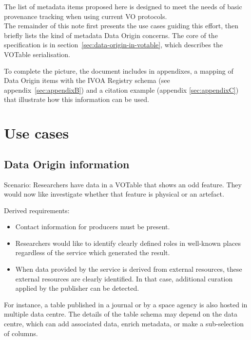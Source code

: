 \documentclass[11pt,a4paper]{ivoa}
\begin{document}
The list of metadata items proposed here is designed to meet the needs of basic provenance
tracking when using current VO protocols.\\


The remainder of this note first presents the use cases guiding this
effort, then briefly lists the kind of metadata Data Origin concerns.
The core of the specification is in
section~\ref{sec:data-origin-in-votable}, which
describes the VOTable serialisation.

To complete the picture, the document includes in appendixes, a mapping of Data Origin items with the IVOA Registry schema (see appendix~\ref{sec:appendixB})
and a citation example (appendix \ref{sec:appendixC}) that illustrate how this information can be used.



\section{Use cases}

\subsection{Data Origin information}

Scenario: Researchers have data in a VOTable that shows an odd feature. They would now like investigate whether that feature is physical or an artefact.

Derived requirements:

\begin{itemize}
\item Contact information for producers must be present.

\item Researchers would like to identify clearly defined roles in well-known places regardless of the service which generated the result.

\item When data provided by the service is derived from external resources, these external resources are clearly identified.  In that case, additional curation applied by the publisher can be detected.
\end{itemize}

For instance, a table published in a journal or by a space agency is also hosted in multiple data centre. The details of the table schema may depend on the data centre, which can add associated data, enrich metadata, or make a sub-selection of columns.
\end{document}
